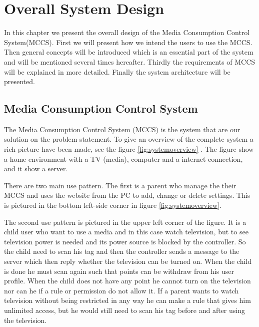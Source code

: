 \chapter{Overall System Design}
In this chapter we present the overall design of the Media Consumption Control System(MCCS). First we will present how we intend the users to use the MCCS. Then general concepts will be introduced which is an essential part of the system and will be mentioned several times hereafter. Thirdly the requirements of MCCS will be explained in more detailed. Finally the system architecture will be presented.    


\section{Media Consumption Control System} %
The Media Consumption Control System (MCCS) is the system that are our solution on the problem statement. To give an overview of the complete system a rich picture have been made, see the figure \ref{fig:systemoverview} \citep{OOAD}. The figure show a home environment with a TV (media), computer and a internet connection, and it show a server. 

There are two main use pattern. The first is a parent who manage the their MCCS and uses the website from the PC to add, change or delete settings. This is pictured in the bottom left-side corner in figure \ref{fig:systemoverview}. 

The second use pattern is pictured in the upper left corner of the figure. It is a child user who want to use a media and in this case watch television, but to see television power is needed and its power source is blocked by the controller. So the child need to scan his tag and then the controller sends a message to the server which then reply whether the television can be turned on. When the child is done he must scan again such that points can be withdraw from his user profile. When the child does not have any point he cannot turn on the television nor can he if a rule or permission do not allow it. If a parent wants to watch television without being restricted in any way he can make a rule that gives him unlimited access, but he would still need to scan his tag before and after using the television.

